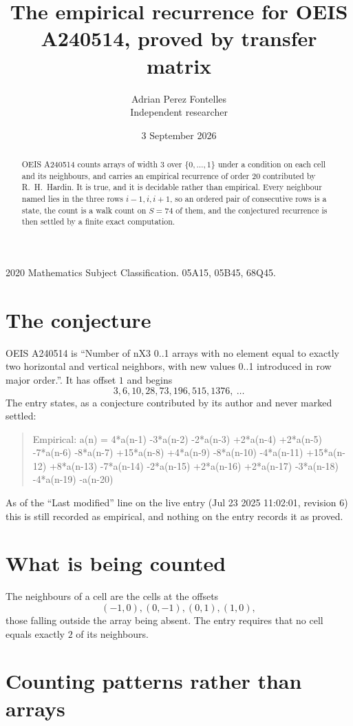 \documentclass[11pt,a4paper]{article}
\title{The empirical recurrence for OEIS A240514, proved by transfer matrix}
\author{Adrian Perez Fontelles\\ \small Independent researcher}
\date{3 September 2026}
\theoremstyle{plain}
\theoremstyle{definition}
\begin{document}
\maketitle

\begin{abstract}
OEIS A240514 counts arrays of width $3$ over $\{0,\dots,1\}$ under a condition on each cell
and its neighbours, and carries an empirical recurrence of order $20$ contributed by
R.~H.~Hardin. It is true, and it is decidable rather than empirical. Every neighbour named lies
in the three rows $i-1,i,i+1$, so an ordered pair of consecutive rows is a state, the count is
a walk count on $S=74$ of them, and the conjectured recurrence is then settled by a finite
exact computation.
\end{abstract}

\noindent\small 2020 Mathematics Subject Classification. 05A15, 05B45, 68Q45.\normalsize

\section{The conjecture}

OEIS A240514 is ``Number of nX3 0..1 arrays with no element equal to exactly two horizontal and vertical neighbors, with new values 0..1 introduced in row major order.''. It has offset $1$ and begins
\[
3, 6, 10, 28, 73, 196, 515, 1376,\ \dots
\]
The entry states, as a conjecture contributed by its author and never marked settled:
\begin{quote}
Empirical: a(n) = 4*a(n-1) -3*a(n-2) -2*a(n-3) +2*a(n-4) +2*a(n-5) -7*a(n-6) -8*a(n-7) +15*a(n-8) +4*a(n-9) -8*a(n-10) -4*a(n-11) +15*a(n-12) +8*a(n-13) -7*a(n-14) -2*a(n-15) +2*a(n-16) +2*a(n-17) -3*a(n-18) -4*a(n-19) -a(n-20)
\end{quote}
As of the ``Last modified'' line on the live entry (Jul 23 2025 11:02:01, revision 6) this is still
recorded as empirical, and nothing on the entry records it as proved.

\section{What is being counted}

The neighbours of a cell are the cells at the offsets
\[
(-1,0), (0,-1), (0,1), (1,0),
\]
those falling outside the array being absent. The entry requires that no cell equals exactly $2$ of its neighbours.

\section{Counting patterns rather than arrays}
\end{document}
